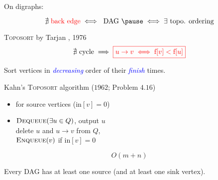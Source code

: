 
\begin{frame}{}
  \centerline{\large On digraphs:}
  \[
    \nexists\; \text{\red{back edge}} \iff \text{ DAG } \pause \iff \exists \text{ topo. ordering}
  \]

  \pause
  \begin{block}{\textsc{Toposort} by Tarjan , 1976}
    \vspace{0.30cm}
    \[
      \nexists \text{ cycle} \implies \textcolor{red}{\boxed{u \to v \iff \text{f}[v] < \text{f}[u]}}
    \]

    \pause
    \vspace{0.50cm}
    \centerline{Sort vertices in \textcolor{blue}{\emph{decreasing}} order of their \textcolor{blue}{\emph{finish}} times.}
  \end{block}
\end{frame}
\begin{frame}{}
  \begin{exampleblock}{Kahn's \textsc{Toposort} algorithm ($1962$; Problem $4.16$) }
    \begin{itemize}
      \setlength{\itemsep}{5pt}
      \item {} for source vertices ($\text{in}[v] = 0$)
      \item {} $\textsc{Dequeue}(\exists u \in Q)$, output $u$ \\[6pt]
	\hspace{1.3cm} delete $u$ and $u \to v$ from $Q$, \\[5pt]
	\hspace{1.3cm} $\textsc{Enqueue}(v)$ if $\text{in}[v] = 0$
    \end{itemize}
  \end{exampleblock}

  \pause
  \[
    O(m + n)
  \]

  \pause
  \begin{lemma}
    Every DAG has at least one source (and at least one sink vertex).
  \end{lemma}

  \pause
  \vspace{0.50cm}
  \centerline{}
\end{frame}
